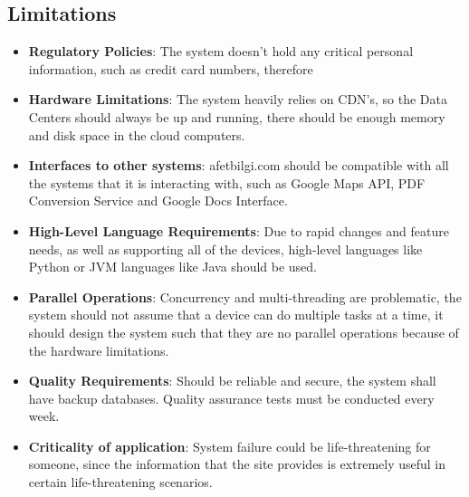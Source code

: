\documentclass[listof=nochaptergap]{report}
\begin{document}
    \subsection{Limitations}
    \begin{itemize}
        \item \textbf{Regulatory Policies}: The system doesn't hold any critical personal information, such as credit card numbers, therefore
        
        \item \textbf{Hardware Limitations}: The system heavily relies on CDN's, so the Data Centers should always be up and running, there should be enough memory and disk space in the cloud computers.
        
        \item \textbf{Interfaces to other systems}: afetbilgi.com should be compatible with all the systems that it is interacting with, such as Google Maps API, PDF Conversion Service and Google Docs Interface. 
        
        \item \textbf{High-Level Language Requirements}: Due to rapid changes and feature needs, as well as supporting all of the devices, high-level languages like Python or JVM languages like Java should be used.
        
        \item \textbf{Parallel Operations}: Concurrency and multi-threading are problematic, the system should not assume that a device can do multiple tasks at a time, it should design the system such that they are no parallel operations because of the hardware limitations.
        
        \item \textbf{Quality Requirements}: Should be reliable and secure, the system shall have backup databases. Quality assurance tests must be conducted every week.
        
        \item \textbf{Criticality of application}: System failure could be life-threatening for someone, since the information that the site provides is extremely useful in certain life-threatening scenarios.
     
    \end{itemize}

\newpage
    
\end{document}

